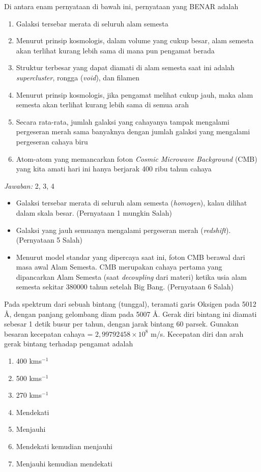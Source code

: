 \documentclass[11pt,fleqn]{exam}
\begin{document}
\begin{questions}
\vspace{0.5cm}
\question Di antara enam pernyataan di bawah ini, pernyataan yang BENAR adalah
\begin{enumerate}
    \item Galaksi tersebar merata di seluruh alam semesta
    \item Menurut prinsip kosmologis, dalam volume yang cukup besar, alam semesta akan terlihat kurang lebih sama di mana pun pengamat berada
    \item Struktur terbesar yang dapat diamati di alam semesta saat ini adalah \textit{supercluster}, rongga (\textit{void}), dan filamen
    \item Menurut prinsip kosmologis, jika pengamat melihat cukup jauh, maka alam semesta akan terlihat kurang lebih sama di semua arah
    \item Secara rata-rata, jumlah galaksi yang cahayanya tampak mengalami pergeseran merah sama banyaknya dengan jumlah galaksi yang mengalami pergeseran cahaya biru
    \item Atom-atom yang memancarkan foton \textit{Cosmic Microwave Background} (CMB) yang kita amati hari ini hanya berjarak 400 ribu tahun cahaya
\end{enumerate}

\bigskip
\textit{Jawaban: } 2, 3, 4

\begin{itemize}
    \item Galaksi tersebar merata di seluruh alam semesta (\textit{homogen}), kalau dilihat dalam skala besar. (Pernyataan 1 mungkin Salah)
    \item Galaksi yang jauh semuanya mengalami pergeseran merah (\textit{redshift}). (Pernyataan 5 Salah)
    \item Menurut model standar yang dipercaya saat ini, foton CMB berawal dari masa awal Alam Semesta. CMB merupakan cahaya pertama yang dipancarkan Alam Semesta (saat \textit{decoupling} dari materi) ketika usia alam semesta sekitar 380000 tahun setelah Big Bang. (Pernyataan 6 Salah)
\end{itemize}

\vspace{0.5cm}
\question Pada spektrum dari sebuah bintang (tunggal), teramati garis Oksigen pada 5012 \AA, dengan panjang gelombang diam pada 5007 \AA. Gerak diri bintang ini diamati sebesar 1 detik busur per tahun, dengan jarak bintang 60 parsek. Gunakan besaran kecepatan cahaya = $2,99792458 \times 10^8$ m/s. Kecepatan diri dan arah gerak bintang terhadap pengamat adalah
\begin{enumerate}
    \item 400 kms$^{-1}$
    \item 500 kms$^{-1}$
    \item 270 kms$^{-1}$
    \item Mendekati
    \item Menjauhi
    \item Mendekati kemudian menjauhi
    \item Menjauhi kemudian mendekati
\end{enumerate}


\end{questions}
\end{document}
